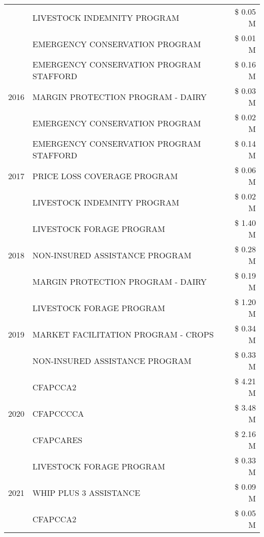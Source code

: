 \begin{tabular}{llr}
 & LIVESTOCK INDEMNITY PROGRAM & \$ 0.05 M \\
 & EMERGENCY CONSERVATION PROGRAM & \$ 0.01 M \\
\cline{1-3}
\multirow[t]{3}{*}{2016} & EMERGENCY CONSERVATION PROGRAM STAFFORD & \$ 0.16 M \\
 & MARGIN PROTECTION PROGRAM - DAIRY & \$ 0.03 M \\
 & EMERGENCY CONSERVATION PROGRAM & \$ 0.02 M \\
\cline{1-3}
\multirow[t]{3}{*}{2017} & EMERGENCY CONSERVATION PROGRAM STAFFORD & \$ 0.14 M \\
 & PRICE LOSS COVERAGE PROGRAM & \$ 0.06 M \\
 & LIVESTOCK INDEMNITY PROGRAM & \$ 0.02 M \\
\cline{1-3}
\multirow[t]{3}{*}{2018} & LIVESTOCK FORAGE PROGRAM & \$ 1.40 M \\
 & NON-INSURED ASSISTANCE PROGRAM & \$ 0.28 M \\
 & MARGIN PROTECTION PROGRAM - DAIRY & \$ 0.19 M \\
\cline{1-3}
\multirow[t]{3}{*}{2019} & LIVESTOCK FORAGE PROGRAM & \$ 1.20 M \\
 & MARKET FACILITATION PROGRAM - CROPS & \$ 0.34 M \\
 & NON-INSURED ASSISTANCE PROGRAM & \$ 0.33 M \\
\cline{1-3}
\multirow[t]{3}{*}{2020} & CFAPCCA2 & \$ 4.21 M \\
 & CFAPCCCCA & \$ 3.48 M \\
 & CFAPCARES & \$ 2.16 M \\
\cline{1-3}
\multirow[t]{3}{*}{2021} & LIVESTOCK FORAGE PROGRAM & \$ 0.33 M \\
 & WHIP PLUS 3 ASSISTANCE & \$ 0.09 M \\
 & CFAPCCA2 & \$ 0.05 M \\
\cline{1-3}
\bottomrule
\end{tabular}
